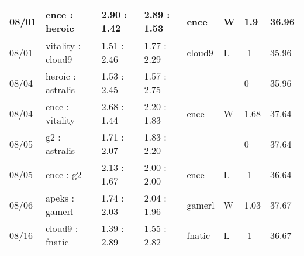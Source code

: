 \begin{small}
\begin{longtable}{|l|l|l|l|l|l|l|l|}
	08/01                               & ence : heroic                       & 2.90 : 1.42                             & 2.89 : 1.53                             & ence                              & W                                 & 1.9                                  & 36.96                             \\ \hline
	08/01                               & vitality : cloud9                   & 1.51 : 2.46                             & 1.77 : 2.29                             & cloud9                            & L                                 & -1                                   & 35.96                             \\ \hline
	08/04                               & heroic : astralis                   & 1.53 : 2.45                             & 1.57 : 2.75                             &                                   &                                   & 0                                    & 35.96                             \\ \hline
	08/04                               & ence : vitality                     & 2.68 : 1.44                             & 2.20 : 1.83                             & ence                              & W                                 & 1.68                                 & 37.64                             \\ \hline
	08/05                               & g2 : astralis                       & 1.71 : 2.07                             & 1.83 : 2.20                             &                                   &                                   & 0                                    & 37.64                             \\ \hline
	08/05                               & ence : g2                           & 2.13 : 1.67                             & 2.00 : 2.00                             & ence                              & L                                 & -1                                   & 36.64                             \\ \hline
	08/06                               & apeks : gamerl                      & 1.74 : 2.03                             & 2.04 : 1.96                             & gamerl                            & W                                 & 1.03                                 & 37.67                             \\ \hline
	08/16                               & cloud9 : fnatic                     & 1.39 : 2.89                             & 1.55 : 2.82                             & fnatic                            & L                                 & -1                                   & 36.67                             \\ \hline

\end{longtable}
\end{small}
